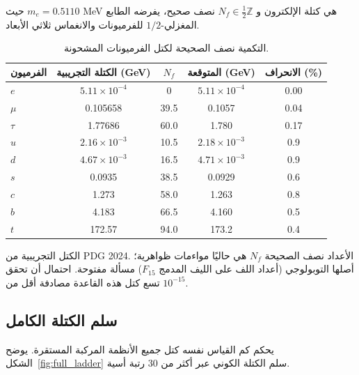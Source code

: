 \documentclass[11pt,a4paper]{article}
\begin{document}
	حيث \(m_e = 0.5110\) MeV هي كتلة الإلكترون و \(N_f \in \frac{1}{2}\mathbb{Z}\) نصف صحيح، يفرضه الطابع المغزلي-\(1/2\) للفرميونات والانغماس ثلاثي الأبعاد.
	
	\begin{table}[htbp]
		\centering
		\caption{التكمية نصف الصحيحة لكتل الفرميونات المشحونة.}
		\label{tab:fermions}
		\small
		\begin{tabular}{l c c c c}
			\toprule
			الفرميون & الكتلة التجريبية (GeV) & \(N_f\) & المتوقعة (GeV) & الانحراف (\%) \\
			\midrule
			\(e\)   & \(5.11\times10^{-4}\) & 0      & \(5.11\times10^{-4}\) & 0.00 \\
			\(\mu\)  & 0.105658             & 39.5   & 0.1057               & 0.04 \\
			\(\tau\) & 1.77686              & 60.0   & 1.780                & 0.17 \\
			\(u\)   & \(2.16\times10^{-3}\) & 10.5   & \(2.18\times10^{-3}\) & 0.9 \\
			\(d\)   & \(4.67\times10^{-3}\) & 16.5   & \(4.71\times10^{-3}\) & 0.9 \\
			\(s\)   & 0.0935               & 38.5   & 0.0929               & 0.6 \\
			\(c\)   & 1.273                & 58.0   & 1.263                & 0.8 \\
			\(b\)   & 4.183                & 66.5   & 4.160                & 0.5 \\
			\(t\)   & 172.57               & 94.0   & 173.2                & 0.4 \\
			\bottomrule
		\end{tabular}
		\par\smallskip
		\footnotesize
		الكتل التجريبية من PDG 2024. الأعداد نصف الصحيحة \(N_f\) هي حاليًا مواءمات ظواهرية؛ أصلها التوبولوجي (أعداد اللف على الليف المدمج \(F_{15}\)) مسألة مفتوحة. احتمال أن تحقق تسع كتل هذه القاعدة مصادفة أقل من \(10^{-15}\).
	\end{table}
	
	\subsection{سلم الكتلة الكامل}
	
	يحكم كم القياس نفسه كتل جميع الأنظمة المركبة المستقرة. يوضح الشكل~\ref{fig:full_ladder} سلم الكتلة الكوني عبر أكثر من 30 رتبة أسية.
	
\end{document}
